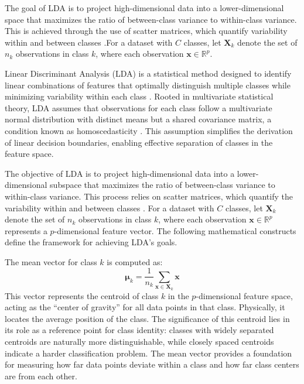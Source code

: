 \documentclass[12pt,a4paper]{article}
\begin{document}
The goal of LDA is to project high-dimensional data into a lower-dimensional space that maximizes the ratio of between-class variance to within-class variance. This is achieved through the use of scatter matrices, which quantify variability within and between classes \cite{duda2001pattern}.For a dataset with $C$ classes, let $\mathbf{X}_k$ denote the set of $n_k$ observations in class $k$, where each observation $\mathbf{x} \in \mathbb{R}^p$.\par

Linear Discriminant Analysis (LDA) is a statistical method designed to identify linear combinations of features that optimally distinguish multiple classes while minimizing variability within each class \cite{fisher1936use}. Rooted in multivariate statistical theory, LDA assumes that observations for each class follow a multivariate normal distribution with distinct means but a shared covariance matrix, a condition known as homoscedasticity \cite{hastie2009elements}. This assumption simplifies the derivation of linear decision boundaries, enabling effective separation of classes in the feature space.\par

The objective of LDA is to project high-dimensional data into a lower-dimensional subspace that maximizes the ratio of between-class variance to within-class variance. This process relies on scatter matrices, which quantify the variability within and between classes \cite{duda2001pattern}. For a dataset with $C$ classes, let $\mathbf{X}_k$ denote the set of $n_k$ observations in class $k$, where each observation $\mathbf{x} \in \mathbb{R}^p$ represents a $p$-dimensional feature vector. The following mathematical constructs define the framework for achieving LDA’s goals.\par

The mean vector for class $k$ is computed as:
\[
\boldsymbol{\mu}_k = \frac{1}{n_k} \sum_{\mathbf{x} \in \mathbf{X}_k} \mathbf{x}
\]
This vector represents the centroid of class $k$ in the $p$-dimensional feature space, acting as the ``center of gravity'' for all data points in that class. Physically, it locates the average position of the class. The significance of this centroid lies in its role as a reference point for class identity: classes with widely separated centroids are naturally more distinguishable, while closely spaced centroids indicate a harder classification problem. The mean vector provides a foundation for measuring how far data points deviate within a class and how far class centers are from each other.
\end{document}
